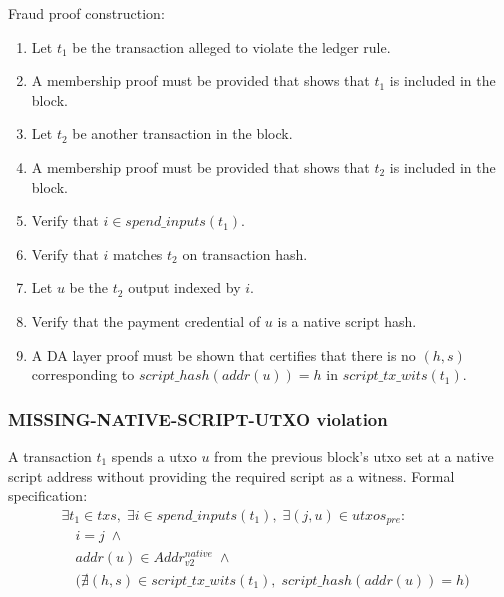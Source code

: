 \documentclass[../midgard.tex]{subfiles}
\begin{document}
Fraud proof construction:
\begin{enumerate}
  \item Let $t_1$ be the transaction alleged to violate the ledger rule.
  \item A membership proof must be provided that shows that $t_1$ is included in the block.
  \item Let $t_2$ be another transaction in the block.
  \item A membership proof must be provided that shows that $t_2$ is included in the block.
  \item Verify that $i \in spend\_inputs(t_1)$.
  \item Verify that $i$ matches $t_2$ on transaction hash.
  \item Let $u$ be the $t_2$ output indexed by $i$.
  \item Verify that the payment credential of $u$ is a native script hash.
  \item A DA layer proof must be shown that certifies that there is no $(h, s)$ corresponding to \break
        $script\_hash(addr(u)) = h$ in $script\_tx\_wits(t_1)$.
\end{enumerate}

\subsubsection{MISSING-NATIVE-SCRIPT-UTXO violation}
\label{violation:MISSING-NATIVE-SCRIPT-UTXO}
A transaction $t_1$ spends a utxo $u$ from the previous block's utxo set at a native script address without providing the required script as a witness.
Formal specification:
\begin{equation*}
\begin{split}
  &\exists t_1 \in txs,\; \exists i \in spend\_inputs(t_1),\; \exists (j, u) \in utxos_{pre}:\\
    &\quad i = j \;\land\\
    &\quad addr(u) \in Addr^{native}_{v2} \;\land\\
    &\quad \bigl(
        \nexists (h, s) \in script\_tx\_wits(t_1),\; script\_hash(addr(u)) = h
      \bigr)
\end{split}
\end{equation*}
\end{document}
